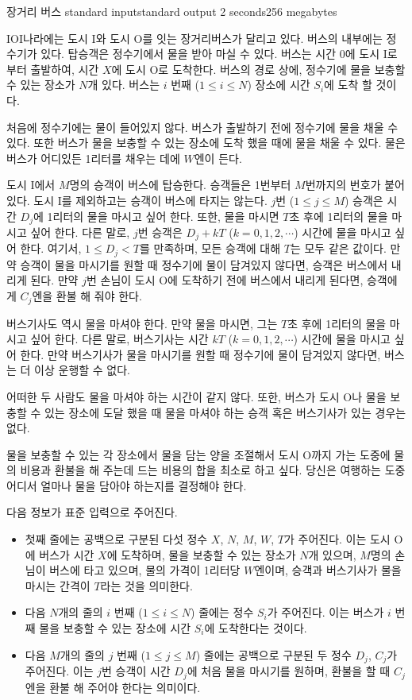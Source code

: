 \begin{problem}{장거리 버스}
	{standard input}{standard output}
	{2 seconds}{256 megabytes}{}
	
	IOI나라에는 도시 I와 도시 O를 잇는 장거리버스가 달리고 있다. 버스의 내부에는 정수기가 있다. 탑승객은 정수기에서 물을 받아 마실 수 있다. 버스는 시간 0에 도시 I로 부터 출발하여, 시간 $X$에 도시 O로 도착한다. 버스의 경로 상에, 정수기에 물을 보충할 수 있는 장소가 $N$개 있다. 버스는 $i$ 번째 ($1 \le i \le N$) 장소에 시간 $S_i$에 도착 할 것이다.
	
	처음에 정수기에는 물이 들어있지 않다. 버스가 출발하기 전에 정수기에 물을 채울 수 있다. 또한 버스가 물을 보충할 수 있는 장소에 도착 했을 때에 물을 채울 수 있다. 물은 버스가 어디있든 1리터를 채우는 데에 $W$엔이 든다.
	
	도시 I에서 $M$명의 승객이 버스에 탑승한다. 승객들은 1번부터 $M$번까지의 번호가 붙어있다. 도시 I를 제외하고는 승객이 버스에 타지는 않는다. $j$번 ($1 \le j \le M$) 승객은 시간 $D_j$에 1리터의 물을 마시고 싶어 한다. 또한, 물을 마시면 $T$초 후에 1리터의 물을 마시고 싶어 한다. 다른 말로, $j$번 승객은 $D_j + kT$ ($k = 0, 1, 2, \cdots$) 시간에 물을 마시고 싶어 한다. 여기서, $1 \le D_j < T$를 만족하며, 모든 승객에 대해 $T$는 모두 같은 값이다. 만약 승객이 물을 마시기를 원할 때 정수기에 물이 담겨있지 않다면, 승객은 버스에서 내리게 된다. 만약 $j$번 손님이 도시 O에 도착하기 전에 버스에서 내리게 된다면, 승객에게 $C_j$엔을 환불 해 줘야 한다.
	
	버스기사도 역시 물을 마셔야 한다. 만약 물을 마시면, 그는 $T$초 후에 1리터의 물을 마시고 싶어 한다. 다른 말로, 버스기사는 시간 $kT$ ($k= 0, 1, 2, \cdots$) 시간에 물을 마시고 싶어 한다. 만약 버스기사가 물을 마시기를 원할 때 정수기에 물이 담겨있지 않다면, 버스는 더 이상 운행할 수 없다.
	
	어떠한 두 사람도 물을 마셔야 하는 시간이 같지 않다. 또한, 버스가 도시 O나 물을 보충할 수 있는 장소에 도달 했을 때 물을 마셔야 하는 승객 혹은 버스기사가 있는 경우는 없다.
	
	물을 보충할 수 있는 각 장소에서 물을 담는 양을 조절해서 도시 O까지 가는 도중에 물의 비용과 환불을 해 주는데 드는 비용의 합을 최소로 하고 싶다. 당신은 여행하는 도중 어디서 얼마나 물을 담아야 하는지를 결정해야 한다.
	
	\InputFile
	
	다음 정보가 표준 입력으로 주어진다.
	
	\begin{itemize}
		\item 첫째 줄에는 공백으로 구분된 다섯 정수 $X$, $N$, $M$, $W$, $T$가 주어진다. 이는 도시 O에 버스가 시간 $X$에 도착하며, 물을 보충할 수 있는 장소가 $N$개 있으며, $M$명의 손님이 버스에 타고 있으며, 물의 가격이 1리터당 $W$엔이며, 승객과 버스기사가 물을 마시는 간격이 $T$라는 것을 의미한다.
		\item 다음 $N$개의 줄의 $i$ 번째 ($1 \le i \le N$) 줄에는 정수 $S_i$가 주어진다. 이는 버스가 $i$ 번째 물을 보충할 수 있는 장소에 시간 $S_i$에 도착한다는 것이다.
		\item 다음 $M$개의 줄의 $j$ 번째 ($1 \le j \le M$) 줄에는 공백으로 구분된 두 정수 $D_j$, $C_j$가 주어진다. 이는 $j$번 승객이 시간 $D_j$에 처음 물을 마시기를 원하며, 환불을 할 때 $C_j$엔을 환불 해 주어야 한다는 의미이다.
	\end{itemize}


\end{problem}
